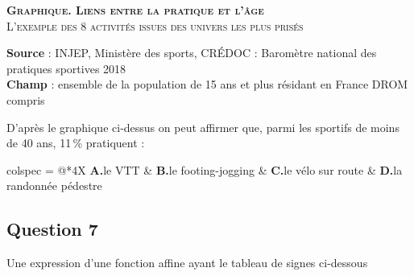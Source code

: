 \begin{center}
	\textbf{\footnotesize\scshape Graphique. Liens entre la pratique et l'âge}\\
	{\footnotesize\scshape L'exemple des 8 activités issues des univers les plus prisés}

	\medskip


	{\tiny\sffamily\textbf{Source} : INJEP, Ministère des sports, CRÉDOC : Baromètre national des pratiques sportives 2018}\\
	{\tiny\sffamily\textbf{Champ} : ensemble de la population de 15 ans et plus résidant en France DROM compris}
\end{center}

D'après le graphique ci-dessus on peut affirmer que, parmi les sportifs de moins de 40 ans, 11\,\% pratiquent :

\medskip
\begin{tblr}{colspec = {@{}*{4}{X}}}
	\textbf{A.}\quad le VTT &
	\textbf{B.}\quad le footing-jogging &
	\textbf{C.}\quad le vélo sur route &
	\textbf{D.}\quad la randonnée pédestre \\
\end{tblr}

\subsection*{Question 7}

Une expression d'une fonction affine ayant le tableau de signes ci-dessous

